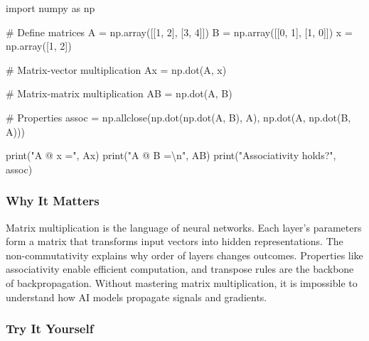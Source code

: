 \documentclass[
  letterpaper,
  DIV=11,
  numbers=noendperiod]{scrreprt}
\newenvironment{Shaded}{\begin{snugshade}}{\end{snugshade}}
\newcommand{\BuiltInTok}[1]{\textcolor[rgb]{0.00,0.23,0.31}{#1}}
\newcommand{\CharTok}[1]{\textcolor[rgb]{0.13,0.47,0.30}{#1}}
\newcommand{\CommentTok}[1]{\textcolor[rgb]{0.37,0.37,0.37}{#1}}
\newcommand{\DecValTok}[1]{\textcolor[rgb]{0.68,0.00,0.00}{#1}}
\newcommand{\ImportTok}[1]{\textcolor[rgb]{0.00,0.46,0.62}{#1}}
\newcommand{\NormalTok}[1]{\textcolor[rgb]{0.00,0.23,0.31}{#1}}
\newcommand{\OperatorTok}[1]{\textcolor[rgb]{0.37,0.37,0.37}{#1}}
\newcommand{\StringTok}[1]{\textcolor[rgb]{0.13,0.47,0.30}{#1}}
\begin{document}
\begin{Shaded}
\begin{Highlighting}[]
\ImportTok{import}\NormalTok{ numpy }\ImportTok{as}\NormalTok{ np}

\CommentTok{\# Define matrices}
\NormalTok{A }\OperatorTok{=}\NormalTok{ np.array([[}\DecValTok{1}\NormalTok{, }\DecValTok{2}\NormalTok{],}
\NormalTok{              [}\DecValTok{3}\NormalTok{, }\DecValTok{4}\NormalTok{]])}
\NormalTok{B }\OperatorTok{=}\NormalTok{ np.array([[}\DecValTok{0}\NormalTok{, }\DecValTok{1}\NormalTok{],}
\NormalTok{              [}\DecValTok{1}\NormalTok{, }\DecValTok{0}\NormalTok{]])}
\NormalTok{x }\OperatorTok{=}\NormalTok{ np.array([}\DecValTok{1}\NormalTok{, }\DecValTok{2}\NormalTok{])}

\CommentTok{\# Matrix{-}vector multiplication}
\NormalTok{Ax }\OperatorTok{=}\NormalTok{ np.dot(A, x)}

\CommentTok{\# Matrix{-}matrix multiplication}
\NormalTok{AB }\OperatorTok{=}\NormalTok{ np.dot(A, B)}

\CommentTok{\# Properties}
\NormalTok{assoc }\OperatorTok{=}\NormalTok{ np.allclose(np.dot(np.dot(A, B), A), np.dot(A, np.dot(B, A)))}

\BuiltInTok{print}\NormalTok{(}\StringTok{"A @ x ="}\NormalTok{, Ax)}
\BuiltInTok{print}\NormalTok{(}\StringTok{"A @ B =}\CharTok{\textbackslash{}n}\StringTok{"}\NormalTok{, AB)}
\BuiltInTok{print}\NormalTok{(}\StringTok{"Associativity holds?"}\NormalTok{, assoc)}
\end{Highlighting}
\end{Shaded}

\subsubsection{Why It Matters}\label{why-it-matters}

Matrix multiplication is the language of neural networks. Each layer's
parameters form a matrix that transforms input vectors into hidden
representations. The non-commutativity explains why order of layers
changes outcomes. Properties like associativity enable efficient
computation, and transpose rules are the backbone of backpropagation.
Without mastering matrix multiplication, it is impossible to understand
how AI models propagate signals and gradients.

\subsubsection{Try It Yourself}\label{try-it-yourself-102}
\end{document}
